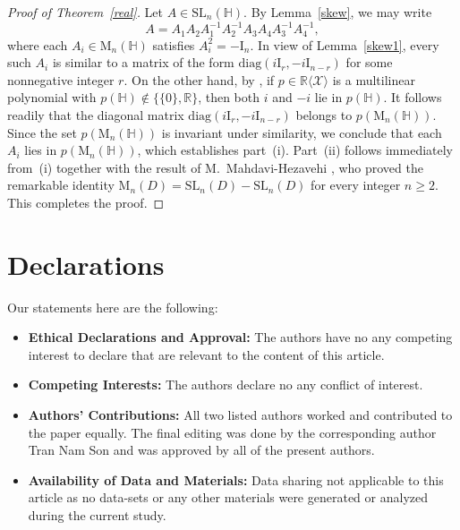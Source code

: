 \documentclass[11pt]{article}
\theoremstyle{definition}
\begin{document}
{{{{				\begin{proof}[Proof of Theorem~\ref{real}]
					Let $A \in \mathrm{SL}_n(\mathbb{H})$. By Lemma~\ref{skew}, we may write
					\[
					A = A_1A_2A_1^{-1}A_2^{-1}A_3A_4A_3^{-1}A_4^{-1},
					\]
					where each $A_i \in \mathrm{M}_n(\mathbb{H})$ satisfies $A_i^2 = -\mathrm{I}_n$.	In view of Lemma~\ref{skew1}, every such $A_i$ is similar to a matrix of the form
					$\mathrm{diag}(i\mathrm{I}_r, -i\mathrm{I}_{n-r})$
					for some nonnegative integer $r$. On the other hand, by \cite[Theorem 1]{Pa_Ma_21}, if $p \in \mathbb{R}\langle \mathcal{X} \rangle$ is a multilinear polynomial with $p(\mathbb{H}) \notin \{\{0\}, \mathbb{R}\}$, then both $i$ and $-i$ lie in $p(\mathbb{H})$. It follows readily that the diagonal matrix
					$\mathrm{diag}(i\mathrm{I}_r, -i\mathrm{I}_{n-r})$
					belongs to $p(\mathrm{M}_n(\mathbb{H}))$. Since the set $p(\mathrm{M}_n(\mathbb{H}))$ is invariant under similarity, we conclude that each $A_i$ lies in $p(\mathrm{M}_n(\mathbb{H}))$, which establishes part~(i).	Part~(ii) follows immediately from~(i) together with the result of M.~Mahdavi-Hezavehi \cite[Lemma~5.1]{Pa_Mad_00}, who proved the remarkable identity
					$\mathrm{M}_n(D) = \mathrm{SL}_n(D) - \mathrm{SL}_n(D)$
					for every integer $n \ge 2$.	This completes the proof.
				\end{proof}
				
				
				
				\bigskip
				
				\section*{Declarations}
				
				Our statements here are the following:
				
				\begin{itemize}
					\item {\bf Ethical Declarations and Approval:} The authors have no any competing interest to declare that are relevant to the content of this article.
					\item {\bf Competing Interests:} The authors declare no any conflict of interest.
					\item  {\bf Authors' Contributions:} All two listed authors worked and contributed to the paper equally. The final editing was done by the corresponding author Tran Nam Son and was approved by all of the present authors.
					\item {\bf Availability of Data and Materials:} Data sharing not applicable to this article as no data-sets or any other materials were generated or analyzed during the current study.
				\end{itemize}
				
}}}}
\end{document}
